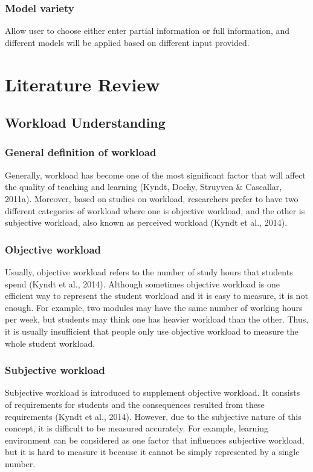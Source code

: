 \documentclass[fyp]{socreport}
\begin{document}
\subsection{Model variety}
Allow user to choose either enter partial information or full information, and different models will be applied based on different input provided.

\chapter{Literature Review}
\section{Workload Understanding}
\subsection{General definition of workload}
Generally, workload has become one of the most significant factor that will affect the quality of teaching and learning (Kyndt, Dochy, Struyven \& Cascallar, 2011a). Moreover, based on studies on workload, researchers prefer to have two different categories of workload where one is objective workload, and the other is subjective workload, also known as perceived workload (Kyndt et al., 2014).

\subsection{Objective workload}
Usually, objective workload refers to the number of study hours that students spend (Kyndt et al., 2014). Although sometimes objective workload is one efficient way to represent the student workload and it is easy to measure, it is not enough. For example, two modules may have the same number of working hours per week, but students may think one has heavier workload than the other. Thus, it is usually insufficient that people only use objective workload to measure the whole student workload.

\subsection{Subjective workload}
Subjective workload is introduced to supplement objective workload. It consists of requirements for students and the consequences resulted from these requirements (Kyndt et al., 2014). However, due to the subjective nature of this concept, it is difficult to be measured accurately. For example, learning environment can be considered as one factor that influences subjective workload, but it is hard to measure it because it cannot be simply represented by a single number.
\end{document}
